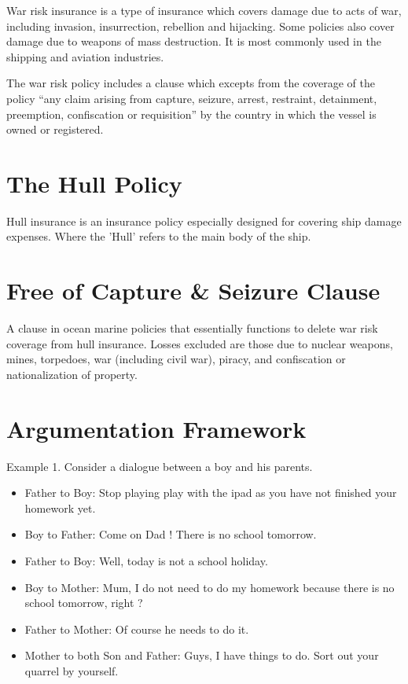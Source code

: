 War risk insurance is a type of insurance which covers damage due to acts of war, including invasion, insurrection, rebellion and hijacking. Some policies also cover damage due to weapons of mass destruction. It is most commonly used in the shipping and aviation industries.

The war risk policy includes a clause which excepts from the coverage of the policy “any claim arising from capture, seizure, arrest, restraint, detainment, preemption, confiscation or requisition” by the country in which the vessel is owned or registered.

\section{The Hull Policy}

Hull insurance is an insurance policy especially designed for covering ship damage expenses. Where the 'Hull' refers to the main body of the ship.

\section{Free of Capture \& Seizure Clause}

A clause in ocean marine policies that essentially functions to delete war risk coverage from hull insurance. Losses excluded are those due to nuclear weapons, mines, torpedoes, war (including civil war), piracy, and confiscation or nationalization of property.

\section{Argumentation Framework}

Example 1. Consider a dialogue between a boy and his parents. \cite{practical_reasoning}
    \begin{itemize}
        \item Father to Boy: Stop playing play with the ipad as you have not finished your homework yet.
        \item Boy to Father: Come on Dad ! There is no school tomorrow.
        \item Father to Boy: Well, today is not a school holiday.
        \item Boy to Mother: Mum, I do not need to do my homework because there is no school tomorrow, right ?
        \item Father to Mother: Of course he needs to do it.
        \item Mother to both Son and Father: Guys, I have things to do. Sort out your
                    quarrel by yourself.
    \end{itemize}
        
